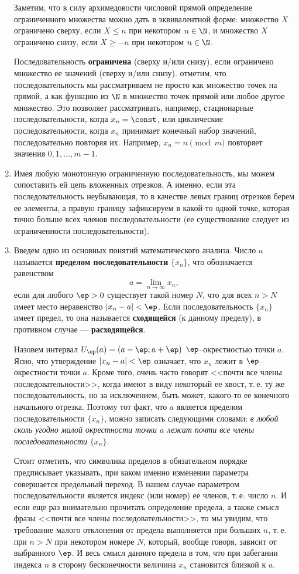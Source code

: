 \begin{enumerate}
Заметим, что в силу архимедовости числовой прямой определение ограниченного множества можно дать в эквивалентной форме: множество $X$ ограничено сверху, если $X\le n$ при некотором $n\in\N$, и множество $X$ ограничено снизу, если $X\ge -n$ при некотором $n\in\N$.

Последовательность \textbf{ограничена} (сверху и/или снизу), если ограничено множество ее значений (сверху и/или снизу). отметим, что последовательность мы рассматриваем не просто как множество точек на прямой, а как функцию из $\N$ в множество точек прямой или любое другое множество. Это позволяет рассматривать, например, стационарные последовательности, когда $x_n=\const$, или циклические последовательности, когда $x_n$ принимает конечный набор значений, последовательно повторяя их. Например, $x_n=n\pmod m$ повторяет значения $0,1,\dots,m-1$.

\item Имея любую монотонную ограниченную последовательность, мы  можем сопоставить ей цепь вложенных отрезков. А именно, если эта последовательность неубывающая, то в качестве левых границ отрезков берем ее элементы, а правую границу зафиксируем в какой-то одной точке, которая точно больше всех членов последовательности (ее существование следует из ограниченности последовательности).
\item Введем одно из основных понятий математического анализа. Число $a$ называется \textbf{пределом последовательности} $\{x_n\}$, что обозначается равенством
$$
a = \lim_{n\to\infty}x_n,
$$
если для любого $\ep>0$ существует такой номер $N$, что для всех $n>N$ имеет место неравенство $|x_n-a|<\ep$. Если последовательность $\{x_n\}$ имеет предел, то она называется \textbf{сходящейся} (к данному пределу), в противном случае --- \textbf{расходящейся}.

Назовем интервал $U_\ep(a)=(a-\ep;a+\ep)$ $\ep$--окрестностью точки $a$. Ясно, что утверждение $|x_n-a|<\ep$ означает, что $x_n$ лежит в $\ep$--окрестности точки $a$. Кроме того, очень часто говорят <<почти все члены последовательности>>, когда имеют в виду некоторый ее хвост, т.\,е. ту же последовательность, но за исключением, быть может, какого-то ее конечного начального отрезка. Поэтому тот факт, что $a$ является пределом последовательности $\{x_n\}$, можно записать следующими словами: \textit{в любой сколь угодно малой окрестности точки $a$ лежат почти все члены последовательности} $\{x_n\}$.

Стоит отметить, что символика пределов в обязательном порядке предписывает указывать, при каком именно изменении параметра совершается предельный переход. В нашем случае параметром последовательности является индекс (или номер) ее членов, т.\,е. число $n$. И если еще раз внимательно прочитать определение предела, а также смысл фразы <<почти все члены последовательности>>, то мы увидим, что требование малого отклонения от предела выполняется при больших $n$, т.\,е. при $n>N$ при некотором номере $N$, который, вообще говоря, зависит от выбранного $\ep$. И весь смысл данного предела в том, что при забегании индекса $n$ в сторону бесконечности величина $x_n$ становится близкой к $a$.


\end{enumerate}
